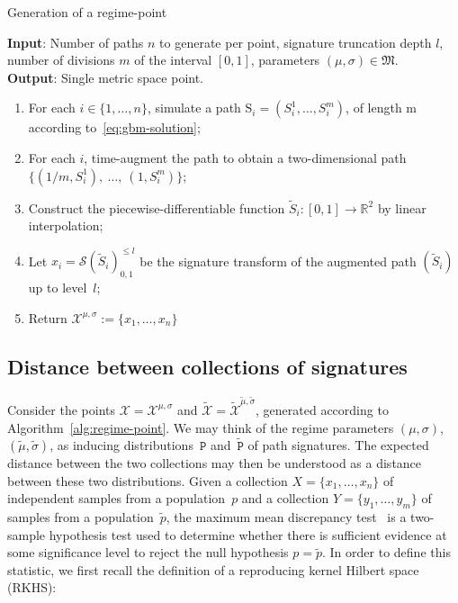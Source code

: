 \documentclass{amsart}[11pt]
\numberwithin{equation}{section}
\theoremstyle{definition}
\newcommand{\Xx}{\mathcal{X}}
\newcommand{\Ss}{\mathcal{S}}
\newcommand{\RR}{\mathbb{R}}
\newcommand{\Mf}{\mathfrak{M}}
\begin{document}
\begin{algorithm}
\caption{Generation of a regime-point}
\textbf{Input}: Number of paths $n$ to generate per point, signature truncation depth $l$, number of divisions $m$ of the interval $[0,1]$, parameters $(\mu, \sigma)\in\Mf$.\\
\textbf{Output}: Single metric space point.
\begin{enumerate}
\item For each $i \in \{1, \ldots, n\}$, simulate a path
$\mathrm{S}_i = (S_i^1, \ldots, S_i^m)$, of length m according to~\eqref{eq:gbm-solution};
\item For each $i$, time-augment the path to obtain a two-dimensional path $\{(1/m, S_i^1), ~\ldots, ~(1, S_i^m)\}$;
\item Construct the piecewise-differentiable function $\widetilde{S}_i: [0,1] \to \RR^2$ by linear interpolation;
\item Let $x_i = \Ss(\widetilde{S}_i)_{0,1}^{\leq l}$ be the signature transform of the augmented path
$(\widetilde{S}_i)$ up to level~$l$;
\item Return $\Xx^{\mu, \sigma} := \{x_1, \ldots, x_n\}$
\end{enumerate}
\label{alg:regime-point}
\end{algorithm}


\subsection{Distance between collections of signatures}

Consider the points $\Xx = \Xx^{\mu, \sigma}$ and $\widetilde{\Xx} = \widetilde{\Xx}^{\widetilde{\mu}, \widetilde{\sigma}}$, generated according to Algorithm~\ref{alg:regime-point}. We may think of the regime parameters $(\mu, \sigma)$,  $(\widetilde{\mu}, \widetilde{\sigma})$, as inducing distributions~$\mathtt{P}$
and~$\widetilde{\mathtt{P}}$ of path signatures.
The expected distance between the two collections may then be understood as a distance between these two distributions.
Given a collection $X = \{x_1, \ldots, x_n\}$ of independent samples from a population~$p$
and a collection $Y = \{y_1, \ldots, y_m\}$ of samples from a population~$\widetilde{p}$,
the maximum mean discrepancy test~\cite{Gretton08} is a two-sample hypothesis test used to determine whether there is sufficient evidence at some significance level to reject the null hypothesis  $p = \widetilde{p}$.
In order to define this statistic, we first recall the definition of a reproducing kernel Hilbert space (RKHS):
\end{document}
